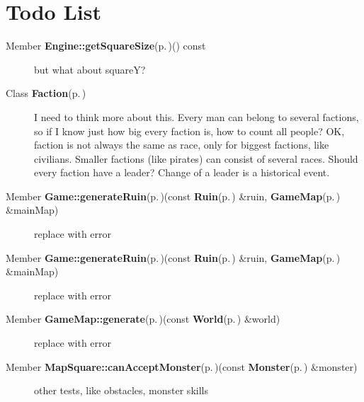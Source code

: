 \section{Todo List}\label{todo}
\label{todo__todo000001}
 \begin{description}
\item[Member {\bf Engine::get\-Square\-Size}{\rm (p.\,\pageref{classEngine_a10})}() const  ]but what about square\-Y?\end{description}


\label{todo__todo000002}
 \begin{description}
\item[Class {\bf Faction}{\rm (p.\,\pageref{classFaction})} ]I need to think more about this. Every man can belong to several factions, so if I know just how big every faction is, how to count all people? OK, faction is not always the same as race, only for biggest factions, like civilians. Smaller factions (like pirates) can consist of several races. Should every faction have a leader? Change of a leader is a historical event.

\end{description}


\label{todo__todo000003}
 \begin{description}
\item[Member {\bf Game::generate\-Ruin}{\rm (p.\,\pageref{classGame_b3})}(const {\bf Ruin}{\rm (p.\,\pageref{classRuin})} \&ruin, {\bf Game\-Map}{\rm (p.\,\pageref{classGameMap})} \&main\-Map) ]replace with error\end{description}


\label{todo__todo000003}
 \begin{description}
\item[Member {\bf Game::generate\-Ruin}{\rm (p.\,\pageref{classGame_b3})}(const {\bf Ruin}{\rm (p.\,\pageref{classRuin})} \&ruin, {\bf Game\-Map}{\rm (p.\,\pageref{classGameMap})} \&main\-Map) ]replace with error\end{description}


\label{todo__todo000005}
 \begin{description}
\item[Member {\bf Game\-Map::generate}{\rm (p.\,\pageref{classGameMap_a16})}(const {\bf World}{\rm (p.\,\pageref{classWorld})} \&world) ]replace with error\end{description}


\label{todo__todo000006}
 \begin{description}
\item[Member {\bf Map\-Square::can\-Accept\-Monster}{\rm (p.\,\pageref{classMapSquare_b0})}(const {\bf Monster}{\rm (p.\,\pageref{classMonster})} \&monster) ]other tests, like obstacles, monster skills\end{description}


